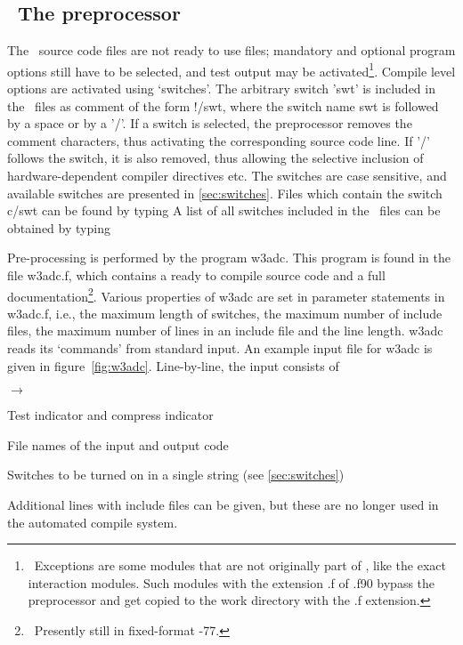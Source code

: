 \vssub
\subsection{~The preprocessor} \label{sec:w3adc}
\vssub

The \ws\ source code files are not ready to use {\fortran} files; mandatory
and optional program options still have to be selected, and test output may be
activated\footnote{~Exceptions are some modules that are not originally part
  of \ws, like the exact interaction modules. Such modules with the extension
  {\file .f} of {\file .f90} bypass the preprocessor and get copied to the
  work directory with the {\file .f} extension.}. Compile level options are
activated using `switches'. The arbitrary switch '{\F swt}' is included in the
\ws\ files as comment of the form {\F !/swt}, where the switch name {\F swt}
is followed by a space or by a '{\F /}'. If a switch is selected, the
preprocessor removes the comment characters, thus activating the corresponding
source code line. If '{\F/}' follows the switch, it is also removed, thus
allowing the selective inclusion of hardware-dependent compiler directives
etc. The switches are case sensitive, and available switches are presented in
\para\ref{sec:switches}. Files which contain the switch {\F c/swt} can be
found by typing  A list of all switches included
in the \ws\ files can be obtained by typing 

\pb
\noindent
Pre-processing is performed by the program {\code w3adc}. This program is
found in the file {\file w3adc.f}, which contains a ready to compile
{\fortran} source code and a full documentation\footnote{~Presently still in
  fixed-format {\fortran}-77.}. Various properties of {\code w3adc} are set in
{\F parameter} statements in {\file w3adc.f}, i.e., the maximum length of
switches, the maximum number of include files, the maximum number of lines in
an include file and the line length. {\code w3adc} reads its `commands' from
standard input. An example input file for {\code w3adc} is given in
figure~\ref{fig:w3adc}. Line-by-line, the input consists of

\begin{list}{$\rightarrow$}{\itemsep 0mm \parsep 0mm}
\item	Test indicator and compress indicator
\item	File names of the input and output code
\item	Switches to be turned on in a single string (see
          \para\ref{sec:switches})
\item   Additional lines with include files can be given, but these are no
        longer used in the automated compile system.
\end{list}


